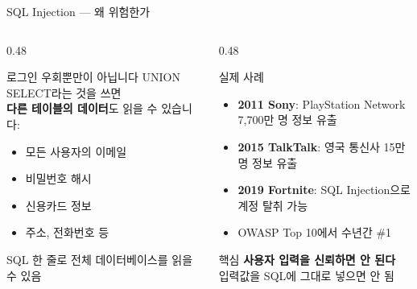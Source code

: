 \documentclass[aspectratio=169,10pt]{beamer}
\newcommand{\hlt}[1]{\textcolor{accent}{\textbf{#1}}}
\begin{document}
\begin{frame}[shrink=3]{SQL Injection — 왜 위험한가}

\begin{columns}[T]
\begin{column}{0.48\textwidth}
\begin{block}{로그인 우회뿐만이 아닙니다}
UNION SELECT라는 것을 쓰면\\
\hlt{다른 테이블의 데이터}도 읽을 수 있습니다:

\vspace{0.3em}
\begin{itemize}
    \item 모든 사용자의 이메일
    \item 비밀번호 해시
    \item 신용카드 정보
    \item 주소, 전화번호 등
\end{itemize}

\vspace{0.3em}
{\footnotesize SQL 한 줄로 전체 데이터베이스를 읽을 수 있음}
\end{block}
\end{column}
\begin{column}{0.48\textwidth}
\begin{block}{실제 사례}
\begin{itemize}
    \item \textbf{2011 Sony}: PlayStation Network 7,700만 명 정보 유출
    \item \textbf{2015 TalkTalk}: 영국 통신사 15만 명 정보 유출
    \item \textbf{2019 Fortnite}: SQL Injection으로 계정 탈취 가능
    \item OWASP Top 10에서 수년간 \#1
\end{itemize}
\end{block}

\vspace{0.3em}
\begin{alertblock}{핵심}
\hlt{사용자 입력을 신뢰하면 안 된다}\\
입력값을 SQL에 그대로 넣으면 안 됨
\end{alertblock}
\end{column}
\end{columns}
\end{frame}
\end{document}
